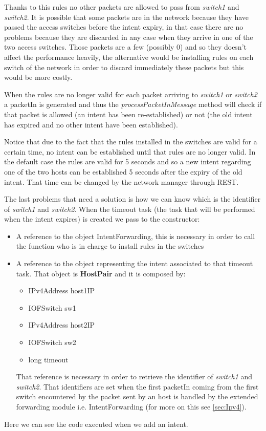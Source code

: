\documentclass[a4paper]{report}
\begin{document}
\noindent Thanks to this rules no other packets are allowed to pass from \textit{switch1} and \textit{switch2}. It is possible that some packets are in the network because they have passed the access switches before the intent expiry, in that case there are no problems because they are discarded in any case when they arrive in one of the two access switches. Those packets are a few (possibly 0) and so they doesn't affect the performance heavily, the alternative would be installing rules on each switch of the network in order to discard immediately these packets but this would be more costly.

\noindent When the rules are no longer valid for each packet arriving to \textit{switch1} or \textit{switch2} a packetIn is generated and thus the \textit{processPacketInMessage} method will check if that packet is allowed (an intent has been re-established) or not (the old intent has expired and no other intent have been established).

\noindent Notice that due to the fact that the rules installed in the switches are valid for a certain time, no intent can be established until that rules are no longer valid. In the default case the rules are valid for 5 seconds and so a new intent regarding one of the two hosts can be established 5 seconds after the expiry of the old intent. That time can be changed by the network manager through REST.

\noindent The last problems that need a solution is how we can know which is the identifier of \textit{switch1} and \textit{switch2}. When the timeout task (the task that will be performed when the intent expires) is created we pass to the constructor:
\begin{itemize}
	\item A reference to the object IntentForwarding, this is necessary in order to call the function who is in charge to install rules in the switches
	\item A reference to the object representing the intent associated to that timeout task. That object is \textbf{HostPair} and it is composed by:
	\begin{itemize}
		\item IPv4Address host1IP
		\item IOFSwitch sw1
		\item IPv4Address host2IP
		\item IOFSwitch sw2
		\item long timeout
	\end{itemize}
	\noindent That reference is necessary in order to retrieve the identifier of \textit{switch1} and \textit{switch2}. That identifiers are set when the first packetIn coming from the first switch encountered by the packet sent by an host is handled by the extended forwarding module i.e. IntentForwarding (for more on this see \ref{sec:Ipv4}).
\end{itemize}
\noindent Here we can see the code executed when we add an intent.
\end{document}
